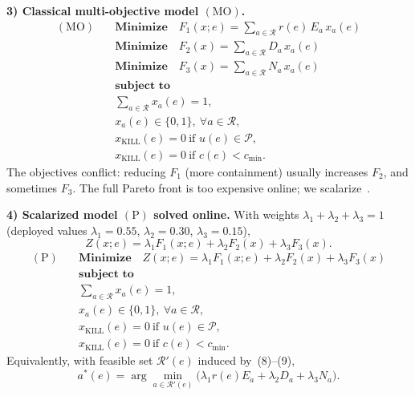 \documentclass{ieeeaccess}
\begin{document}
\textbf{3) Classical multi-objective model $(\mathrm{MO})$.}
\begin{equation}
\begin{aligned}
(\mathrm{MO})\quad
& \textbf{Minimize}\quad F_1(x;e)=\sum_{a\in\mathcal{R}} r(e)\, E_a\, x_a(e) \\
& \textbf{Minimize}\quad F_2(x)=\sum_{a\in\mathcal{R}} D_a\, x_a(e) \\
& \textbf{Minimize}\quad F_3(x)=\sum_{a\in\mathcal{R}} N_a\, x_a(e) \\[0.35em]
& \textbf{subject to} \\
& \sum_{a\in\mathcal{R}} x_a(e)=1, \\
& x_a(e)\in\{0,1\},\ \forall a\in\mathcal{R}, \\
& x_{\mathrm{KILL}}(e)=0\ \text{if } u(e)\in\mathcal{P}, \\
& x_{\mathrm{KILL}}(e)=0\ \text{if } c(e)<c_{\min}.
\end{aligned}
\tag{5}\label{eq:moo-vector}
\end{equation}
The objectives conflict: reducing $F_1$ (more containment) usually increases $F_2$, and sometimes $F_3$. The full Pareto front is too expensive online; we scalarize~\cite{ref14}.

\textbf{4) Scalarized model $(\mathrm{P})$ solved online.}
With weights $\lambda_1+\lambda_2+\lambda_3=1$ (deployed values $\lambda_1{=}0.55$, $\lambda_2{=}0.30$, $\lambda_3{=}0.15$),
\begin{equation}
Z(x;e)=\lambda_1 F_1(x;e)+\lambda_2 F_2(x)+\lambda_3 F_3(x).
\tag{6}
\end{equation}
\begin{equation}
\begin{aligned}
(\mathrm{P})\quad
& \textbf{Minimize}\quad Z(x;e)=\lambda_1 F_1(x;e)+\lambda_2 F_2(x)+\lambda_3 F_3(x) \\[0.35em]
& \textbf{subject to} \\
& \sum_{a\in\mathcal{R}} x_a(e)=1, \\
& x_a(e)\in\{0,1\},\ \forall a\in\mathcal{R}, \\
& x_{\mathrm{KILL}}(e)=0\ \text{if } u(e)\in\mathcal{P}, \\
& x_{\mathrm{KILL}}(e)=0\ \text{if } c(e)<c_{\min}.
\end{aligned}
\tag{P}\label{eq:moo-main}
\end{equation}
Equivalently, with feasible set $\mathcal{R}'(e)$ induced by~(8)--(9),
\begin{equation}
a^*(e)=\arg\min_{a\in\mathcal{R}'(e)}\bigl(\lambda_1 r(e)E_a+\lambda_2 D_a+\lambda_3 N_a\bigr).
\tag{7}
\end{equation}
\end{document}
